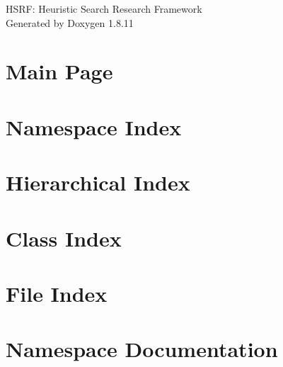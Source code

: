 \documentclass[twoside]{article}
\newcommand{\+}{\discretionary{\mbox{\scriptsize$\hookleftarrow$}}{}{}}
\begin{document}
\hypersetup{pageanchor=false,
             bookmarksnumbered=true,
             pdfencoding=unicode
            }
\begin{titlepage}
\vspace*{7cm}
\begin{center}%
{\Large H\+S\+RF\+: Heuristic Search Research Framework }\\
\vspace*{1cm}
{\large Generated by Doxygen 1.8.11}\\
\end{center}
\end{titlepage}
\tableofcontents
{}
\hypersetup{pageanchor=true}

\section{Main Page}
\label{index}\hypertarget{index}{}
\section{Namespace Index}

\section{Hierarchical Index}

\section{Class Index}

\section{File Index}

\section{Namespace Documentation}
























\end{document}
